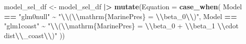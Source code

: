\documentclass[
]{article}
\newenvironment{Shaded}{\begin{snugshade}}{\end{snugshade}}
\newcommand{\AttributeTok}[1]{\textcolor[rgb]{0.13,0.29,0.53}{#1}}
\newcommand{\FunctionTok}[1]{\textcolor[rgb]{0.13,0.29,0.53}{\textbf{#1}}}
\newcommand{\NormalTok}[1]{#1}
\newcommand{\OtherTok}[1]{\textcolor[rgb]{0.56,0.35,0.01}{#1}}
\newcommand{\SpecialCharTok}[1]{\textcolor[rgb]{0.81,0.36,0.00}{\textbf{#1}}}
\newcommand{\StringTok}[1]{\textcolor[rgb]{0.31,0.60,0.02}{#1}}
\begin{document}
\begin{Shaded}
\begin{Highlighting}[]
\NormalTok{model\_sel\_df }\OtherTok{\textless{}{-}}\NormalTok{ model\_sel\_df }\SpecialCharTok{|\textgreater{}} 
  \FunctionTok{mutate}\NormalTok{(}\AttributeTok{Equation =} \FunctionTok{case\_when}\NormalTok{(}
\NormalTok{    Model }\SpecialCharTok{==} \StringTok{"glm0null"} \SpecialCharTok{\textasciitilde{}} \StringTok{"}\SpecialCharTok{\textbackslash{}\textbackslash{}}\StringTok{(}\SpecialCharTok{\textbackslash{}\textbackslash{}}\StringTok{mathrm\{MarinePres\} = }\SpecialCharTok{\textbackslash{}\textbackslash{}}\StringTok{beta\_0}\SpecialCharTok{\textbackslash{}\textbackslash{}}\StringTok{)"}\NormalTok{,}
\NormalTok{    Model }\SpecialCharTok{==} \StringTok{"glm1coast"} \SpecialCharTok{\textasciitilde{}} \StringTok{"}\SpecialCharTok{\textbackslash{}\textbackslash{}}\StringTok{(}\SpecialCharTok{\textbackslash{}\textbackslash{}}\StringTok{mathrm\{MarinePres\} = }\SpecialCharTok{\textbackslash{}\textbackslash{}}\StringTok{beta\_0 + }\SpecialCharTok{\textbackslash{}\textbackslash{}}\StringTok{beta\_1 }\SpecialCharTok{\textbackslash{}\textbackslash{}}\StringTok{cdot dist}\SpecialCharTok{\textbackslash{}\textbackslash{}}\StringTok{\_coast}\SpecialCharTok{\textbackslash{}\textbackslash{}}\StringTok{)"}
\NormalTok{  ))}


\end{Highlighting}
\end{Shaded}
\end{document}
